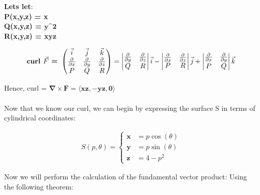\documentclass[a4paper]{article}
\begin{document}
\textbf{Lets let}: \\
\textbf{P(x,y,z) = x} \\
\textbf{Q(x,y,z) = $\textbf{y^2}$} \\
\textbf{R(x,y,z) = xyz} 

\begin{align}
    \text{\textbf{curl }}\vec{F}\text{\textbf{ = }}
    \begin{pmatrix}
        \vec{i} & \vec{j} & \vec{k} \\
        \frac{\partial}{\partial x} &   \frac{\partial}{\partial y} &   \frac{\partial}{\partial z} \\
        P & Q & R 
    \end{pmatrix}
    =
    \begin{vmatrix}
         \frac{\partial}{\partial y} & \frac{\partial}{\partial z} \\
         Q & R 
    \end{vmatrix}
    \vec{i} - 
    \begin{vmatrix}
         \frac{\partial}{\partial x} & \frac{\partial}{\partial z} \\
         P & R 
    \end{vmatrix}
    \vec{j} +
     \begin{vmatrix}
         \frac{\partial}{\partial x} & \frac{\partial}{\partial y} \\
         P & Q 
    \end{vmatrix}
    \vec{k} 
\end{align}

Hence, curl = $\mathbf{\nabla \times F = \langle xz, -yz, 0 \rangle}$
\\ 
\\

Now that we know our curl, we can begin by expressing the surface S in terms of cylindrical coordinates:

\begin{align}
    S(p, \theta) = \left\{
                \begin{aligned}
                    \textbf{x} &= p\cos(\theta) \\
                    \textbf{y} &= p\sin(\theta) \\
                    \textbf{z} &= 4 - p^2
                \end{aligned}
                \right.
\end{align}

Now we will perform the calculation of the fundamental vector product:
Using the following theorem:
\end{document}
